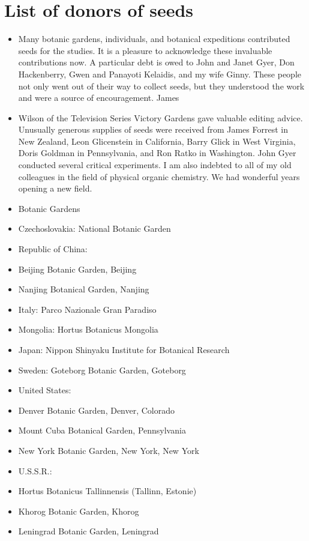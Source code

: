 \chapter{List of donors of seeds}

\begin{itemize}
\item Many botanic gardens, individuals, and botanical expeditions contributed seeds
for the studies. It is a pleasure to acknowledge these invaluable contributions now. A
particular debt is owed to John and Janet Gyer, Don Hackenberry, Gwen and Panayoti
Kelaidis, and my wife Ginny. These people not only went out of their way to collect
seeds, but they understood the work and were a source of encouragement. James
\item Wilson of the Television Series Victory Gardens gave valuable editing advice.
Unusually generous supplies of seeds were received from James Forrest in New
Zealand, Leon Glicenstein in California, Barry Glick in West Virginia, Doris Goldman in
Pennsylvania, and Ron Ratko in Washington. John Gyer conducted several critical
experiments. I am also indebted to all of my old colleagues in the field of physical
organic chemistry. We had wonderful years opening a new field.
\item Botanic Gardens
\item Czechoslovakia: National Botanic Garden
\item Republic of China:
\item Beijing Botanic Garden, Beijing
\item Nanjing Botanical Garden, Nanjing
\item Italy: Parco Nazionale Gran Paradiso
\item Mongolia: Hortus Botanicus Mongolia
\item Japan: Nippon Shinyaku Institute for Botanical Research
\item Sweden: Goteborg Botanic Garden, Goteborg
\item United States:
\item Denver Botanic Garden, Denver, Colorado
\item Mount Cuba Botanical Garden, Pennsylvania
\item New York Botanic Garden, New York, New York
\item U.S.S.R.:
\item Hortus Botanicus Tallinnensis (Tallinn, Estonie)
\item Khorog Botanic Garden, Khorog
\item Leningrad Botanic Garden, Leningrad

\end{itemize}
